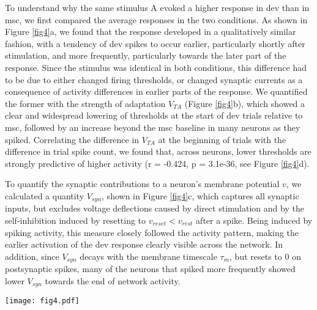 \documentclass[pdflatex,referee,iicol,sn-basic]{sn-jnl}
\theoremstyle{thmstyleone}%
\theoremstyle{thmstyletwo}%
\theoremstyle{thmstylethree}%
\begin{document}
To understand why the same stimulus A evoked a higher response in dev than in msc, we first compared the average responses in the two conditions. As shown in Figure \ref{fig4}a, we found that the response developed in a qualitatively similar fashion, with a tendency of dev spikes to occur earlier, particularly shortly after stimulation, and more frequently, particularly towards the later part of the response. Since the stimulus was identical in both conditions, this difference had to be due to either changed firing thresholds, or changed synaptic currents as a consequence of activity differences in earlier parts of the response. We quantified the former with the strength of adaptation $V_{TA}$ (Figure \ref{fig4}b), which showed a clear and widespread lowering of thresholds at the start of dev trials relative to msc, followed by an increase beyond the msc baseline in many neurons as they spiked. Correlating the difference in $V_{TA}$ at the beginning of trials with the difference in trial spike count, we found that, across neurons, lower thresholds are strongly predictive of higher activity (r = -0.424, p = 3.1e-36, see Figure \ref{fig4}d).

To quantify the synaptic contributions to a neuron's membrane potential $v$, we calculated a quantity $V_{syn}$, shown in Figure \ref{fig4}c, which captures all synaptic inputs, but excludes voltage deflections caused by direct stimulation and by the self-inhibition induced by resetting to $v_{reset} < v_{rest}$ after a spike. Being induced by spiking activity, this measure closely followed the activity pattern, making the earlier activation of the dev response clearly visible across the network. In addition, since $V_{syn}$ decays with the membrane timescale $\tau_m$, but resets to $0$ on postsynaptic spikes, many of the neurons that spiked more frequently showed lower $V_{syn}$ towards the end of network activity.

\begin{figure*}%
    \centering
    \texttt{[image: fig4.pdf]}
    \caption{Responses and threshold adaptation in a TA-only ablation. \textbf{a, b, c} Post-stimulus histograms across target trials, showing trial time along the horizontal axis, and neurons along the vertical, sorted by the time of the first recorded spike across all trials and conditions. Left and middle column, target trials in dev and msc sequence, respectively; right column, contrast between these two. \textbf{d} Per-neuron relationship between the contrast (dev - msc) in $V_{TA}$ at the start of trials, and the contrast in average number of spikes fired, excluding inhibitory neurons, and associated linear regression (r = -0.424, p = 3.1e-36). \textbf{e} Contribution of $V_{TA}$ and $V_{syn}$ to bins with increased firing in dev (i.e., red bins in the spike probability contrast, \textbf{a}), weighted by that same contrast. \textbf{f} Contribution of $V_{TA}$ relative to the sum of the weighted contributions in \textbf{e}. \textbf{g} Relative contribution of $V_{TA}$ across networks, showing median (solid line) and inter-quartile range (shaded area)}
    \label{fig4}
\end{figure*}
\end{document}

